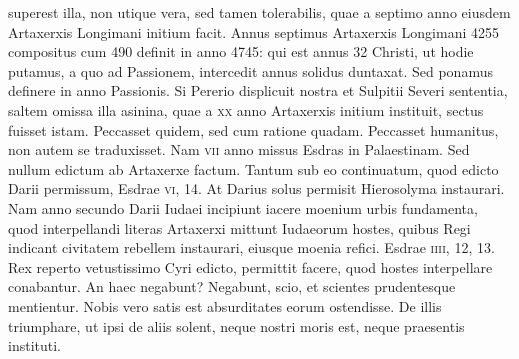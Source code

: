 \begin{parnumbers}
superest illa, non utique vera, sed tamen tolerabilis, quae a
septimo anno eiusdem Artaxerxis Longimani initium facit.
\lnr{}Annus septimus Artaxerxis Longimani 4255 compositus cum 490
definit in anno 4745: qui est annus 32 Christi, ut hodie putamus,
a quo ad Passionem, intercedit annus solidus duntaxat.
\lnr{}Sed
ponamus definere in anno Passionis.
\lnr{}Si Pererio displicuit nostra et
Sulpitii Severi sententia, saltem omissa illa asinina, quae a \textsc{xx} anno
Artaxerxis initium instituit, sectus fuisset istam.
\lnr{}Peccasset quidem,
sed cum ratione quadam.
\lnr{}Peccasset humanitus, non autem
se traduxisset.
\lnr{}Nam \textsc{vii} anno missus Esdras in Palaestinam.
\lnr{}Sed nullum edictum ab Artaxerxe factum. Tantum sub eo continuatum,
quod edicto Darii permissum, Esdrae \textsc{vi}, 14.
\lnr{}At Darius
solus permisit Hierosolyma instaurari.
\lnr{}Nam anno secundo Darii
Iudaei incipiunt iacere moenium urbis fundamenta, quod interpellandi
literas Artaxerxi mittunt Iudaeorum hostes, quibus Regi indicant
civitatem rebellem instaurari, eiusque moenia refici.
\lnr{}Esdrae \textsc{iiii}, 12, 13.
\lnr{}Rex reperto vetustissimo Cyri edicto, permittit facere,
quod hostes interpellare conabantur.
\lnr{}An haec negabunt?
\lnr{}Negabunt, scio, et scientes prudentesque mentientur.
\lnr{}Nobis vero satis
est absurditates eorum ostendisse.
\lnr{}De illis triumphare, ut ipsi de
aliis solent, neque nostri moris est, neque praesentis instituti.


\end{parnumbers}
